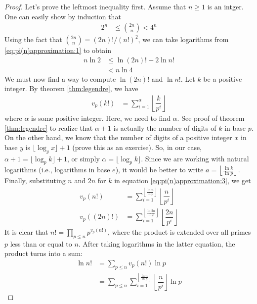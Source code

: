 	\begin{proof}
		Let's prove the leftmost inequality first. Assume that $n \geq 1$ is an intger. One can easily show by induction that
		\begin{align}
		\label{eq:pi(n)approximation:1}
		2^n
			& \leq \binom{2n}{n} < 4^n
		\end{align}
		Using the fact that $\binom{2n}{n} = (2n)!/(n!)^2$, we can take logarithms from \eqref{eq:pi(n)approximation:1} to obtain
		\begin{align}
		\label{eq:pi(n)approximation:2}
		n \ln 2
			& \leq \ln (2n)! - 2 \ln n!\\
			& < n \ln 4
		\end{align}
		We must now find a way to compute $\ln(2n)!$ and $\ln n!$. Let $k$ be a positive integer. By theorem \eqref{thm:legendre}, we have
		\begin{align}
		\label{eq:pi(n)approximation:3}
		v_p(k!)
			& = \sum_{i=1}^{\alpha}\left\lfloor\dfrac{k}{p^i}\right\rfloor
		\end{align}
		where $\alpha$ is some positive integer. Here, we need to find $\alpha$. See proof of theorem \eqref{thm:legendre} to realize that $\alpha+1$ is actually the number of digits of $k$ in base $p$. On the other hand, we know that the number of digits of a positive integer $x$ in base $y$ is $\lfloor\log_y x\rfloor+1$ (prove this as an exercise). So, in our case, $\alpha+1=\lfloor\log_p k\rfloor+1$, or simply $\alpha = \lfloor\log_p k\rfloor$. Since we are working with natural logarithms (i.e., logarithms in base $e$), it would be better to write $a = \left\lfloor \frac{\ln k}{\ln p}\right\rfloor$. Finally, substituting $n$ and $2n$ for $k$ in equation \eqref{eq:pi(n)approximation:3}, we get
			\begin{align*}
				v_p(n!)
					& = \sum_{i=1}^{\left\lfloor \frac{\ln n}{\ln p}\right\rfloor}\left\lfloor\dfrac{n}{p^i}\right\rfloor\\
				v_p\left((2n)!\right)
					& = \sum_{i=1}^{\left\lfloor \frac{\ln 2n}{\ln p}\right\rfloor}\left\lfloor\dfrac{2n}{p^i}\right\rfloor
			\end{align*}
		It is clear that $n! = \prod\limits_{p\leq n} p^{v_p(n!)}$, where the product is extended over all primes $p$ less than or equal to $n$. After taking logarithms in the latter equation, the product turns into a sum:
			\begin{align*}
				\ln n!
					& = \sum_{p \leq n} v_p(n!) \ln p\\
					& = \sum_{p \leq n}  \sum_{i=1}^{\left\lfloor \frac{\ln n}{\ln p}\right\rfloor}\left\lfloor\dfrac{n}{p^i}\right\rfloor \ln p

\end{align*}
\end{proof}
